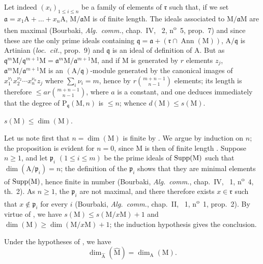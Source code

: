 Let indeed $(x_i)_{1\leq i\leq n}$ be a family of elements of $\mathfrak{r}$ such that, if we set $\mathfrak{a}=x_1\mathrm{A}+\ldots+x_n\mathrm{A}$, $\mathrm{M}/\mathfrak{a}\mathrm{M}$ is of finite length.
The ideals associated to $\mathrm{M}/\mathfrak{a}\mathrm{M}$ are then maximal (Bourbaki, \emph{Alg.~comm.}, chap.~IV, \textsection~2, n\textsuperscript{o}~5, prop.~7) and since these are the only prime ideals containing $\mathfrak{q}=\mathfrak{a}+(\mathfrak{r}\cap\operatorname{Ann}(\mathrm{M}))$, $\mathrm{A}/\mathfrak{q}$ is Artinian (\emph{loc.~cit.}, prop.~9) and $\mathfrak{q}$ is an ideal of definition of $\mathrm{A}$.
But as $\mathfrak{q}^m\mathrm{M}/\mathfrak{q}^{m+1}\mathrm{M}=\mathfrak{a}^m\mathrm{M}/\mathfrak{a}^{m+1}\mathrm{M}$, and if $\mathrm{M}$ is generated by $r$ elements $z_j$, $\mathfrak{a}^m\mathrm{M}/\mathfrak{a}^{m+1}\mathrm{M}$ is an $(\mathrm{A}/\mathfrak{q})$-module generated by the canonical images of $x_1^{\nu_1}x_2^{\nu_2}\cdots x_n^{\nu_n}z_j$ where $\sum_i\nu_i=m$, hence by $r\binom{m+n-1}{n-1}$ elements; its length is therefore $\leq ar\binom{m+n-1}{n-1}$, where $a$ is a constant, and one deduces immediately that the degree of $\mathrm{P}_\mathfrak{q}(\mathrm{M},n)$ is $\leq n$; whence $d(\mathrm{M})\leq s(\mathrm{M})$.

\begin{env}[16.2.3.4]
\label{0.16.2.3.4}
$s(\mathrm{M})\leq\dim(\mathrm{M})$.
\end{env}

Let us note first that $n=\dim(\mathrm{M})$ is finite by .
We argue by induction on $n$; the proposition is evident for $n=0$, since $\mathrm{M}$ is then of finite length .
Suppose $n\geq 1$, and let $\mathfrak{p}_i$ $(1\leq i\leq m)$ be the prime ideals of $\operatorname{Supp}(\mathrm{M})$ such that $\dim(\mathrm{A}/\mathfrak{p}_i)=n$; the definition of the $\mathfrak{p}_i$ shows that they are minimal elements of $\operatorname{Supp}(\mathrm{M})$, hence finite in number (Bourbaki, \emph{Alg.~comm.}, chap.~IV, \textsection~1, n\textsuperscript{o}~4, th.~2).
As $n\geq 1$, the $\mathfrak{p}_i$ are not maximal, and there therefore exists $x\in\mathfrak{r}$ such that $x\notin\mathfrak{p}_i$ for every $i$ (Bourbaki, \emph{Alg.~comm.}, chap.~II, \textsection~1, n\textsuperscript{o}~1, prop.~2).
By virtue of , we have $s(\mathrm{M})\leq s(\mathrm{M}/x\mathrm{M})+1$ and $\dim(\mathrm{M})\geq\dim(\mathrm{M}/x\mathrm{M})+1$; the induction hypothesis gives the conclusion.

\begin{corollary}[16.2.4]
\label{0.16.2.4}
Under the hypotheses of , we have
\begin{equation}
\label{0.16.2.4.1}
\tag{16.2.4.1}
  \dim_{\widehat{\mathrm{A}}}(\widehat{\mathrm{M}})=\dim_\mathrm{A}(\mathrm{M}).
\end{equation}
\end{corollary}

